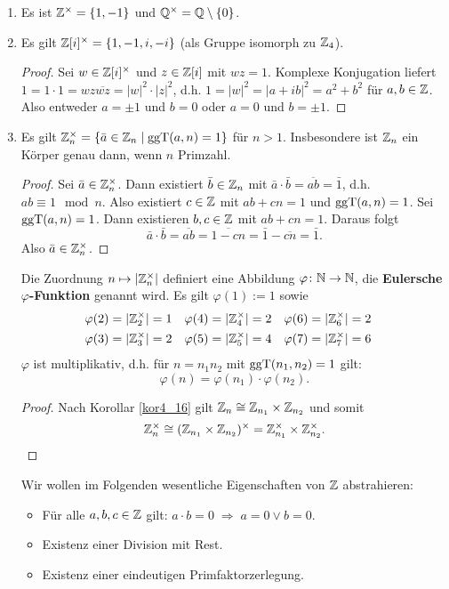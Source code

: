 \begin{beispiel}\label{beispiel5_3}
	\begin{enumerate}[label=(\arabic*)]
		\item Es ist $\mathbb{Z}^\times = \{1,-1\}$ und $\mathbb{Q}^\times = \mathbb{Q} \setminus \{0\}$.
		\item Es gilt $\mathbb{Z}[i]^\times = \{1,-1,i,-i\}$ (als Gruppe isomorph zu $\mathbb{Z}_4$).
		\begin{proof}
			Sei $w \in \mathbb{Z}[i]^\times$ und $z \in \mathbb{Z}[i]$ mit $wz = 1$. Komplexe Konjugation liefert $1 = 1\cdot 1 = wz \overline{wz} = |w|^2 \cdot |z|^2$, d.h. $1 = |w|^2 = |a + ib|^2 = a^2 + b^2$ für $a,b \in \mathbb{Z}$. Also entweder $a = \pm 1$ und $b = 0$ oder $a = 0$ und $b = \pm 1$.
		\end{proof}
		\item Es gilt $\mathbb{Z}_n^\times = \{\bar{a} \in \mathbb{Z}_n \mid \mathrm{ggT}(a,n) =1\}$ für $n > 1$. Insbesondere ist $\mathbb{Z}_n$ ein Körper genau dann, wenn $n$ Primzahl.
		\begin{proof}
			Sei $\bar{a} \in \mathbb{Z}_n^\times$. Dann existiert $\bar{b} \in \mathbb{Z}_n$ mit $\bar{a}\cdot\bar{b} = \overline{ab} = \bar{1}$, d.h. $ab \equiv 1 \mod n$. Also existiert $c \in \mathbb{Z}$ mit $ab + cn = 1$ und $\mathrm{ggT}(a,n) = 1$. Sei $\mathrm{ggT}(a,n) = 1$. Dann existieren $b,c \in \mathbb{Z}$ mit $ab + cn = 1$. Daraus folgt
			\[\bar{a}\cdot\bar{b} = \overline{ab} = \overline{1 -cn} = \bar{1} - \overline{cn} = \bar{1}.\]
			Also $\bar{a} \in \mathbb{Z}_n^\times$.
		\end{proof}
		Die Zuordnung $n \mapsto |\mathbb{Z}_n^\times|$ definiert eine Abbildung $\varphi \colon \mathbb{N}\to\mathbb{N}$, die \textbf{Eulersche $\varphi$-Funktion} genannt wird. Es gilt $\varphi(1) := 1$ sowie
		\begin{align*}
			&\varphi(2) = |\mathbb{Z}_2^\times| = 1& &\varphi(4) = |\mathbb{Z}_4^\times| = 2& &\varphi(6) = |\mathbb{Z}_6^\times| = 2&\\
			&\varphi(3) = |\mathbb{Z}_3^\times| = 2& &\varphi(5) = |\mathbb{Z}_5^\times| = 4& &\varphi(7) = |\mathbb{Z}_7^\times| = 6&
		\end{align*}
		$\varphi$ ist multiplikativ, d.h. für $n = n_1 n_2$ mit $\mathrm{ggT}(n_1, n_2) = 1$ gilt:
		\[\varphi(n) = \varphi(n_1) \cdot \varphi(n_2).\]
		\begin{proof}
			Nach Korollar \ref{kor4_16} gilt $\mathbb{Z}_n \cong \mathbb{Z}_{n_1} \times \mathbb{Z}_{n_2}$ und somit
			\[\mathbb{Z}_n^\times  \cong (\mathbb{Z}_{n_1} \times \mathbb{Z}_{n_2})^\times = \mathbb{Z}_{n_1}^\times \times \mathbb{Z}_{n_2}^\times.\]
		\end{proof}
		Wir wollen im Folgenden wesentliche Eigenschaften von $\mathbb{Z}$ abstrahieren:
		\begin{itemize}
			\item Für alle $a,b,c \in \mathbb{Z}$ gilt: $a \cdot b = 0 \;\Rightarrow\; a=0 \lor b=0$.
			\item Existenz einer Division mit Rest.
			\item Existenz einer eindeutigen Primfaktorzerlegung.
		\end{itemize}
	\end{enumerate}
\end{beispiel}
